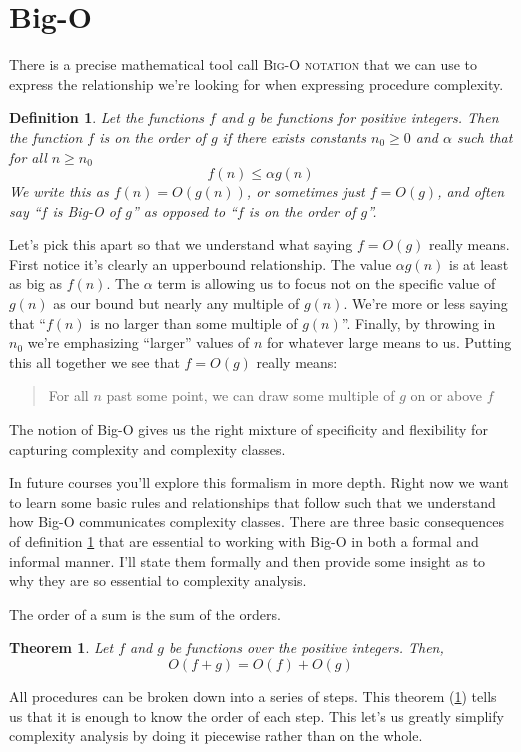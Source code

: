 \documentclass[]{tufte-handout}
\newtheorem{define}{Definition}
\newtheorem{theorem}{Theorem}
\begin{document}
\section{ Big-O }

There is a precise mathematical tool call \textsc{Big-O notation} that we can use to express the relationship we're looking for when expressing procedure complexity. 
\begin{define}
Let the functions $f$ and $g$ be functions for positive integers.  Then the function $f$ is \textit{on the order of} $g$ if there exists constants $n_0 \geq 0 $ and $\alpha$ such that for all $n 	\geq n_0$ 
\[
f(n) \leq \alpha g(n)
\]
We write this as $f(n) = O(g(n))$, or sometimes just $f = O(g)$, and often say ``$f$ is Big-O of $g$'' as opposed to ``$f$ is on the order of $g$''.
\label{def:bigO}
\end{define}

Let's pick this apart so that we understand what saying $f = O(g)$ really means. First notice it's clearly an upperbound relationship. The value $\alpha g(n)$ is at least as big as $f(n)$. The $\alpha$ term is allowing us to focus not on the specific value of $g(n)$ as our bound but nearly any multiple of $g(n)$.  We're more or less saying that ``$f(n)$ is no larger than some multiple of $g(n)$''.  Finally, by throwing in $n_0$ we're emphasizing ``larger'' values of $n$ for whatever large means to us. Putting this all together we see that $f = O(g)$ really means:
\begin{quote} 
For all $n$ past some point, we can draw some multiple\sidenote{$\alpha$} of $g$ on or above $f$
\end{quote}
The notion of Big-O gives us the right mixture of specificity and flexibility for capturing complexity and complexity classes.   

In future courses you'll explore this formalism in more depth. Right now we want to learn some basic rules and relationships that follow such that we understand how Big-O communicates complexity classes. There are three basic consequences of definition \ref{def:bigO} that are essential to working with Big-O in both a formal and informal manner. I'll state them formally and then provide some insight as to why they are so essential to complexity analysis.

The order of a sum is the sum of the orders. 
\begin{theorem}
Let $f$ and $g$ be functions over the positive integers. Then,
\[
O(f + g) = O(f) + O(g)
\]
\label{th:sum}
\end{theorem}
All procedures can be broken down into a series of steps. This theorem (\ref{th:sum}) tells us that it is enough to know the order of each step. This let's us greatly simplify complexity analysis by doing it piecewise rather than on the whole. 
\end{document}
